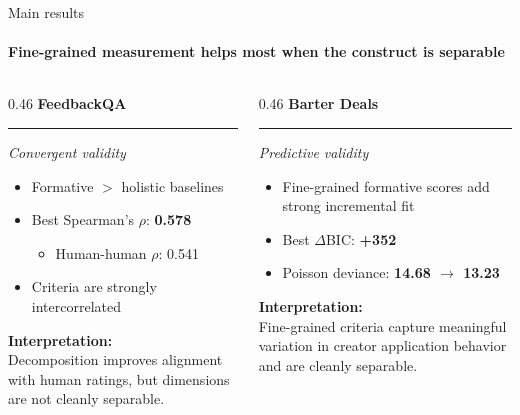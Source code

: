 
\begin{frame}{Main results}
\framesubtitle{Fine-grained measurement helps most when the construct is separable}

\begin{columns}[t]
    \begin{column}{0.46\textwidth}
        {\large \textbf{FeedbackQA}}\\[0.1cm]
        \hrule
        \vspace{0.2cm}
        \textit{Convergent validity}

        \vspace{0.3cm}
        \begin{itemize}
            \item Formative $>$ holistic baselines
            \item Best Spearman's $\rho$: \textbf{0.578}
            \begin{itemize}
                \item Human-human $\rho$: 0.541
            \end{itemize}
            \item Criteria are strongly intercorrelated
        \end{itemize}

        \vspace{0.2cm}
        \textbf{Interpretation:}\\
        Decomposition improves alignment with human ratings, but dimensions are not cleanly separable.
    \end{column}

    \begin{column}{0.46\textwidth}
        {\large \textbf{Barter Deals}}\\[0.1cm]
        \hrule
        \vspace{0.2cm}
        \textit{Predictive validity}

        \vspace{0.3cm}
        \begin{itemize}
            \item Fine-grained formative scores add strong incremental fit
            \item Best $\Delta$BIC: \textbf{+352}
            \item Poisson deviance: \textbf{14.68 $\rightarrow$ 13.23}
        \end{itemize}

        \vspace{0.2cm}
        \textbf{Interpretation:}\\
        Fine-grained criteria capture meaningful variation in creator application behavior and are cleanly separable.
    \end{column}
\end{columns}

\end{frame}

